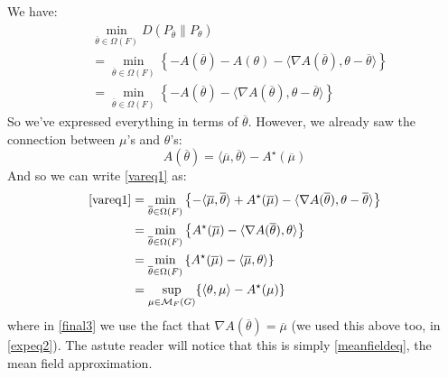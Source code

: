 \documentclass{article}
\newcommand{\M}{\mathcal{M}}
\begin{document}
We have:
\begin{align}
& 
\min_{\overline\theta\in \Omega(F)} D(P_{\overline\theta} \| P_\theta)
\\
&=
\min_{\overline\theta \in \Omega(F)}
\left\{
- A(\overline\theta)
-
A(\theta)
-
\langle
\nabla A(\overline\theta), \theta - \overline\theta
\rangle
\right\}
\\
&=
\min_{\overline\theta \in \Omega(F)}
\left\{
- A(\overline\theta)
-
\langle
\nabla A(\overline\theta), \theta - \overline\theta
\rangle
\right\}
\label{vareq1}
\end{align}
So we've expressed everything in terms of $\overline\theta$.
However, we already saw the connection between $\mu$'s and $\theta$'s:
$$
A(\overline\theta)
=
\langle
\overline\mu
,
\overline\theta
\rangle
- A^\star(\overline\mu)
$$
And so we can write \eqref{vareq1} as:
\begin{align}
\eqref{vareq1}
&=  
\min_{\overline\theta \in \Omega(F)}
\left\{
- \langle
\overline\mu
,
\overline\theta
\rangle
+ A^\star(\overline\mu)
-
\langle
\nabla A(\overline\theta), \theta - \overline\theta
\rangle
\right\}
\\
&=  
\min_{\overline\theta \in \Omega(F)}
\left\{
 A^\star(\overline\mu)
-
\langle
\nabla A(\overline\theta), \theta
\rangle
\right\}
\\
&=  
\min_{\overline\theta \in \Omega(F)}
\left\{
 A^\star(\overline\mu)
-
\langle
\overline\mu, \theta
\rangle
\right\}
\label{final3}
\\
&=
\sup_{\mu\in\M_F(G)}
\{
\langle
\theta, \mu
\rangle
-
A^\star
(\mu)
\}
\end{align}
where in \eqref{final3} we use the fact that $\nabla A(\overline\theta) = \overline\mu$ (we used this above too, in \eqref{expeq2}).
The astute reader will notice that this is simply \eqref{meanfieldeq}, the mean field approximation.
\end{document}
